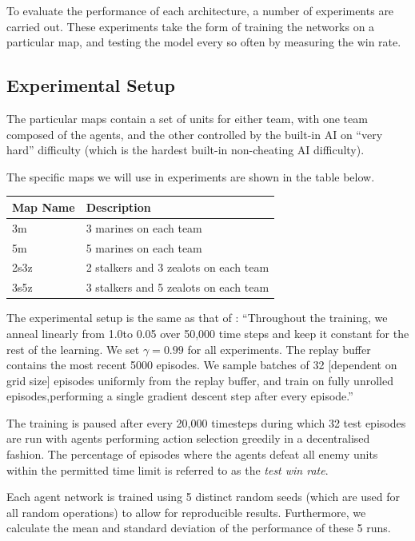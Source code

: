 To evaluate the performance of each architecture, a number of experiments are carried out. These experiments take the form of training the networks on a particular map, and testing the model every so often by measuring the win rate.

\subsection{Experimental Setup}

The particular maps contain a set of units for either team, with one team composed of the agents, and the other controlled by the built-in AI on ``very hard'' difficulty (which is the hardest built-in non-cheating AI difficulty).

The specific maps we will use in experiments are shown in the table below.

\vspace{3mm}
\begin{tabular}{ |p{2.5cm}||p{6.6cm}|  }
 \hline
 \centering Map Name& \centering Description\tabularnewline
 \hline
 \centering 3m   & 3 marines on each team\\
 \hline
 \centering 5m   & 5 marines on each team\\
 \hline
 \centering 2s3z   & 2 stalkers and 3 zealots on each team\\
 \hline
 \centering 3s5z   & 3 stalkers and 5 zealots on each team\\
 \hline
 
\end{tabular}
\vspace{3mm}

The experimental setup is the same as that of \cite{smac}: ``Throughout the training, we anneal linearly from 1.0to 0.05 over 50,000 time steps and keep it constant for the rest of the learning. We set $\gamma= 0.99$ for all experiments. The replay buffer contains the most recent 5000 episodes.  We sample batches of 32 [dependent on grid size] episodes uniformly from the replay buffer, and train on fully unrolled episodes,performing a single gradient descent step after every episode.'' 

The training is paused after every 20,000 timesteps during which 32 test episodes are run with agents performing action selection greedily in a decentralised fashion. The percentage of episodes where the agents defeat all enemy units within the permitted time limit is referred to as the \textit{test win rate}.

Each agent network is trained using 5 distinct random seeds (which are used for all random operations) to allow for reproducible results. Furthermore, we calculate the mean and standard deviation of the performance of these 5 runs.

